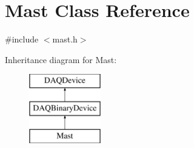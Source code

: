 \hypertarget{classMast}{\section{Mast Class Reference}
\label{classMast}
}


{\ttfamily \#include $<$mast.\-h$>$}

Inheritance diagram for Mast\-:\begin{figure}[H]
\begin{center}
\leavevmode
\includegraphics[height=3.000000cm]{classMast}
\end{center}
\end{figure}
